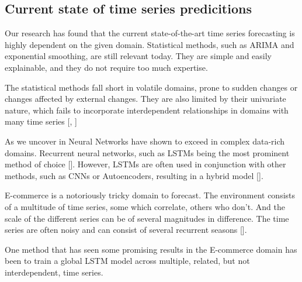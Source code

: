 \subsection{Current state of time series predicitions}


Our research has found that the current state-of-the-art time series forecasting is highly dependent
on the given domain. Statistical methods, such as ARIMA and exponential smoothing,
are still relevant today. They are simple and easily explainable, and they do not require
too much expertise.

The statistical methods fall short in volatile domains, prone to sudden changes or changes affected by external changes.
They are also limited by their univariate nature, which fails to
incorporate interdependent relationships in domains with many time series [, ]

As we uncover in  Neural Networks have shown to exceed in complex data-rich domains. Recurrent neural networks, such as LSTMs being the most
prominent method of choice []. However, LSTMs are often used in conjunction with other methods, such as CNNs or Autoencoders,
resulting in a hybrid model [].

E-commerce is a notoriously tricky domain to forecast. The environment consists of a multitude of time series,
some which correlate, others who don't. And the scale of the different series can be of several magnitudes in difference.
The time series are often noisy and can consist of several recurrent seasons [].

One method that has seen some promising results in the E-commerce domain has been to train a global LSTM model across multiple,
related, but not interdependent, time series.
